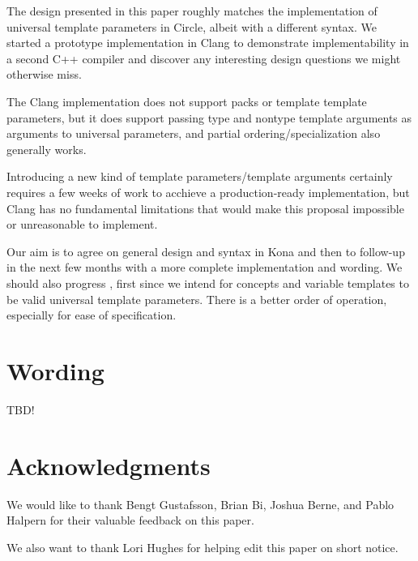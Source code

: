 \documentclass{wg21}
\begin{document}
The design presented in this paper roughly matches the implementation of universal template parameters in Circle, albeit with a different syntax.
We started a prototype implementation in Clang to demonstrate implementability in a second C++ compiler and discover any interesting design questions we might otherwise
miss.

The Clang implementation does not support packs or template template parameters, but it does support passing type and nontype template arguments
as arguments to universal parameters, and partial ordering/specialization also generally works.

Introducing a new kind of template parameters/template arguments certainly requires a few weeks of work to acchieve a production-ready implementation,
but Clang has no fundamental limitations that would make this proposal impossible or unreasonable to implement.


Our aim is to agree on general design and syntax in Kona and then to follow-up in the next few months with a more complete implementation and wording.
We should also progress , first since we intend for concepts and variable templates to be valid universal template parameters.
There is a better order of operation, especially for ease of specification.

\section{Wording}

TBD!

\section{Acknowledgments}

We would like to thank Bengt Gustafsson, Brian Bi, Joshua Berne, and Pablo Halpern for their
valuable feedback on this paper.


We also want to thank Lori Hughes for helping edit this paper on short notice.





\renewcommand{\section}[2]{}%

\begin{thebibliography}{9}


\end{thebibliography}
\end{document}
